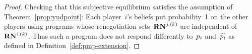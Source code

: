 \documentclass[sigconf]{aamas}
\theoremstyle{definition}
\begin{document}
\begin{proof}

Checking that this 
subjective equilibrium
satisfies the assumption of Theorem~\ref{prop:yudpoint}:
Each player~$i$'s beliefs put probability~1
    on the other players using programs
    whose renegotiation sets~$\mathbf{RN}^{j,(k)}$
    are independent of~$\mathbf{RN}^{i,(k)}$.
    Thus such a program does not respond differently
    to~$p_i$ and~$\widetilde{p_i}$
    as defined in Definition~\ref{def:pmp-extension}.
    
\end{proof}
\end{document}
